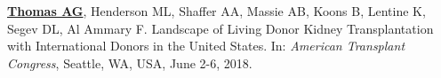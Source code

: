 \documentclass[10pt]{article}
\makeatletter
\newlength{\bibhang}
\newlength{\bibsep}
 {\@listi \global\bibsep\itemsep \global\advance\bibsep by\parsep}
\newenvironment{bibenum*}
  {\renewcommand\labelenumi{[\theenumi]}%
   \etaremune[
     topsep=0pt,
     itemsep=\bibsep,
     parsep=0pt,partopsep=0pt,
     itemindent=-\bibhang,
     leftmargin={\bibhang+\widthof{[999]}}]}
  {\endetaremune}
\makeatother
\begin{document}
\begin{bibenum*}
\item \underline{\textbf{Thomas AG}}, Henderson ML, Shaffer AA,
  Massie AB, Koons B, Lentine K, Segev DL, Al Ammary F.
  Landscape of Living Donor Kidney Transplantation with
  International Donors in the United States.
  In: \emph{American Transplant Congress},
  Seattle, WA, USA, June 2-6, 2018.








\end{bibenum*}
\end{document}
